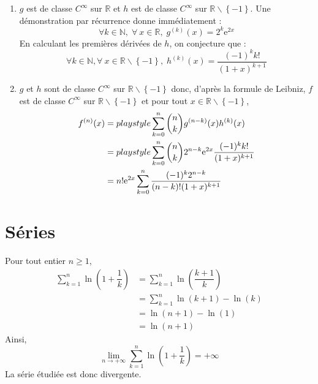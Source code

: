 \documentclass[a4paper,twoside,french,11pt]{VcCours}
\begin{document}
\begin{Exercice}{}\end{Exercice}\begin{enumerate}
\item
$g$ est de classe $C^{\infty}$ sur $\mathbb{R}$ et $h$ est de classe $C^{\infty}$ sur $\mathbb{R}\backslash\left\lbrace-1 \right\rbrace $. Une démonstration par récurrence donne immédiatement :
$$ \forall k \in \mathbb{N}, \; \forall\:x\in\mathbb{R}, \; g^{(k)}(x)=2^k\mathrm{e}^{2x}$$
En calculant les premières dérivées de $h$, on conjecture que :
$$ \forall k \in \mathbb{N}, \forall\:x\in\mathbb{R}\backslash\left\lbrace-1 \right\rbrace, \; h^{(k)}(x)=\dfrac{(-1)^kk!}{(1+x)^{k+1}}$$
\item $g$ et $h$ sont de classe $C^{\infty}$ sur $\mathbb{R}\backslash\left\lbrace-1 \right\rbrace$ donc, d'après la formule de Leibniz, $f$ est de classe $C^{\infty}$ sur $\mathbb{R}\backslash\left\lbrace-1 \right\rbrace$ et pour tout $x \in \mathbb{R} \backslash\left\lbrace-1 \right\rbrace$,
\begin{align*}
f^{(n)}(x) & = playstyle\sum\limits_{k=0}^{n}\dbinom{n}{k}g^{(n-k)}(x)h^{(k)}(x) \\
&= playstyle\sum\limits_{k=0}^{n}\dbinom{n}{k}2^{n-k}\mathrm{e}^{2x}\dfrac{(-1)^k k!}{(1+x)^{k+1}}\\
& = n!\mathrm{e}^{2x}\sum\limits_{k = 0}^n \dfrac{{( - 1)^k 2^{n - k} }}{{(n - k)!}(1 + x)^{k + 1}} 
\end{align*}
\end{enumerate}

\section{Séries}


\begin{Exercice}{}\end{Exercice}Pour tout entier $n \geq 1$,
\begin{align*}
\sum_{k=1}^n \ln \left( 1 + \dfrac{1}{k} \right) & = \sum_{k=1}^n \ln \left( \dfrac{k+1}{k} \right) \\
& = \sum_{k=1}^n \ln(k+1) - \ln(k) \\
& = \ln(n+1)- \ln(1) \\
& = \ln(n+1)
\end{align*}
Ainsi,
$$ \lim_{n \rightarrow + \infty} \sum_{k=1}^n \ln \left( 1 + \dfrac{1}{k} \right) = + \infty$$
La série étudiée est donc divergente.
\end{document}
